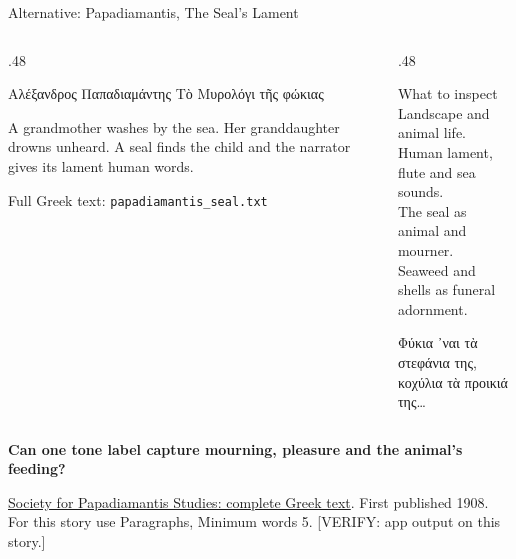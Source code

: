 \documentclass[aspectratio=169,10pt]{beamer}
\newcommand{\key}[1]{\textcolor{aegean}{\textbf{#1}}}
\newcommand{\source}[1]{\vfill{\scriptsize\color{slate}#1\par}}
\newcommand{\question}[1]{\medskip\par\key{#1}\par}
\begin{document}
\begin{frame}{Alternative: Papadiamantis, The Seal's Lament}
  \begin{columns}[T]
    \begin{column}{.48\textwidth}
      \begin{block}{Αλέξανδρος Παπαδιαμάντης}
        {\large\porson Τὸ Μυρολόγι τῆς φώκιας}
      \end{block}
      \small A grandmother washes by the sea. Her granddaughter drowns unheard. A seal finds the child and the narrator gives its lament human words.
      \medskip\par
      Full Greek text: \texttt{papadiamantis\_seal.txt}
    \end{column}
    \begin{column}{.48\textwidth}
      \begin{block}{What to inspect}
        Landscape and animal life.\\[5pt]
        Human lament, flute and sea sounds.\\[5pt]
        The seal as animal and mourner.\\[5pt]
        Seaweed and shells as funeral adornment.
      \end{block}
      {\porson Φύκια ᾽ναι τὰ στεφάνια της,\\
      κοχύλια τὰ προικιά της…}
    \end{column}
  \end{columns}
  \question{Can one tone label capture mourning, pleasure and the animal's feeding?}
  \source{\href{https://www.papadiamantis.net/aleksandros-papadiamantis/syggrafiko-ergo/diigimata/257-t-myrologi-t-s-fokias-1908}{Society for Papadiamantis Studies: complete Greek text}. First published 1908.\\
  For this story use Paragraphs, Minimum words 5. [VERIFY: app output on this story.]}
\end{frame}
\end{document}
